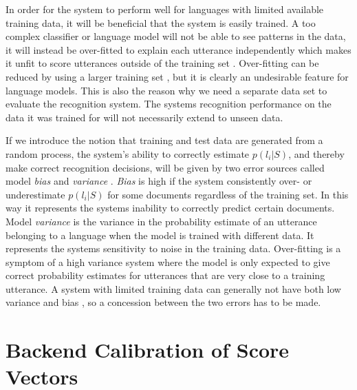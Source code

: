 In order for the system to perform well for languages with limited available training data, it will be beneficial that the system is easily trained. A too complex classifier or language model will not be able to see patterns in the data, it will instead be over-fitted to explain each utterance independently which makes it unfit to score utterances outside of the training set \cite[p. 311]{information}. Over-fitting can be reduced by using a larger training set \cite[p. 147]{machinelearningbook}, but it is clearly an undesirable feature for language models. This is also the reason why we need a separate data set to evaluate the recognition system. The systems recognition performance on the data it was trained for will not necessarily extend to unseen data.

If we introduce the notion that training and test data are generated from a random process, the system's ability to correctly estimate $p(l_i | S)$, and thereby make correct recognition decisions, will be given by two error sources called model \emph{bias} and \emph{variance} \cite[149]{machinelearningbook}. \emph{Bias} is high if the system consistently over- or underestimate $p(l_i | S)$ for some documents regardless of the training set. In this way it represents the systems inability to correctly predict certain documents. Model \emph{variance} is the variance in the probability estimate of an utterance belonging to a language when the model is trained with different data. It represents the systems sensitivity to noise in the training data. Over-fitting is a symptom of a high variance system where the model is only expected to give correct probability estimates for utterances that are very close to a training utterance. A system with limited training data can generally not have both low variance and bias \cite[312]{information}, so a concession between the two errors has to be made.


\section{Backend Calibration of Score Vectors}
\label{sect:backendscoring}


